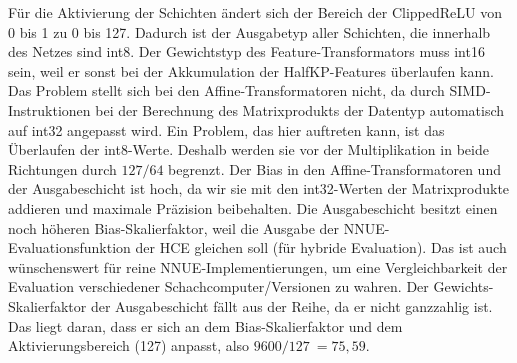\begin{table}[ht]
  \caption{Skalierfaktor und Datentypen für Gewichte und Bias des \acp{NNUE} sowie Ausgabetyp der Schichten basierend auf Werten der Stockfish \ac{NNUE}-Implementierung \cite{StockfishNNUE}}
  \label{table:netQuantization}
  \renewcommand{\arraystretch}{1.2}
  \centering
  \sffamily
  \begin{footnotesize}
  \end{footnotesize}
  \rmfamily
\end{table}

Für die Aktivierung der Schichten ändert sich der Bereich der Clipped\ac{ReLU} von 0 bis 1 zu 0 bis 127. Dadurch ist der Ausgabetyp aller Schichten, die innerhalb des Netzes sind int8. Der Gewichtstyp des Feature-Transformators muss int16 sein, weil er sonst bei der Akkumulation der HalfKP-Features überlaufen kann. Das Problem stellt sich bei den Affine-Transformatoren nicht, da durch \ac{SIMD}-Instruktionen bei der Berechnung des Matrixprodukts der Datentyp automatisch auf int32 angepasst wird. Ein Problem, das hier auftreten kann, ist das Überlaufen der int8-Werte. Deshalb werden sie vor der Multiplikation in beide Richtungen durch $127/64$ begrenzt. Der Bias in den Affine-Transformatoren und der Ausgabeschicht ist hoch, da wir sie mit den int32-Werten der Matrixprodukte addieren und maximale Präzision beibehalten. Die Ausgabeschicht besitzt einen noch höheren Bias-Skalierfaktor, weil die Ausgabe der \ac{NNUE}-Evaluationsfunktion der \ac{HCE} gleichen soll (für hybride Evaluation). Das ist auch wünschenswert für reine \ac{NNUE}-Implementierungen, um eine Vergleichbarkeit der Evaluation verschiedener Schachcomputer/Versionen zu wahren. Der Gewichts-Skalierfaktor der Ausgabeschicht fällt aus der Reihe, da er nicht ganzzahlig ist. Das liegt daran, dass er sich an dem Bias-Skalierfaktor und dem Aktivierungsbereich (127) anpasst, also $9600/127~=75,59$.

